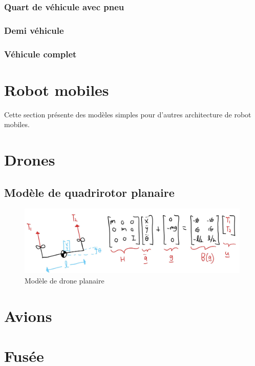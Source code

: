 \subsubsection{Quart de véhicule avec pneu}

\subsubsection{Demi véhicule}

\subsubsection{Véhicule complet}


\newpage
\section{Robot mobiles}

Cette section présente des modèles simples pour d'autres architecture de robot mobiles.





\newpage
\section{Drones}

\subsection{Modèle de quadrirotor planaire}

\begin{figure}[htbp]
	\centering
		\includegraphics[width=0.99\textwidth]{fig/planar_drone.jpg}
	\caption{Modèle de drone planaire}
	\label{fig:planar_drone}
\end{figure}



\newpage
\section{Avions}



\newpage
\section{Fusée}